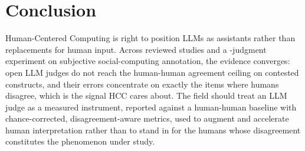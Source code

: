 \section{Conclusion}
Human-Centered Computing is right to position LLMs as assistants rather than replacements for human input. Across
\STN{} reviewed studies and a \SOCnjudg{}-judgment experiment on subjective social-computing annotation, the
evidence converges: open LLM judges do not reach the human-human agreement ceiling on contested constructs, and
their errors concentrate on exactly the items where humans disagree, which is the signal HCC cares about. The field
should treat an LLM judge as a measured instrument, reported against a human-human baseline with chance-corrected,
disagreement-aware metrics, used to augment and accelerate human interpretation rather than to stand in for the
humans whose disagreement constitutes the phenomenon under study.
